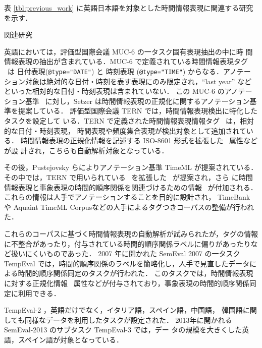 \documentclass[japanese]{jnlp_1.4}
\newcommand{\modified}[1]{}
\def\timex{}
\def\timexii{}
\def\timexiii{}
\def\value{}
\def\tlink{}
\begin{document}
表 \ref{tbl:previous_work} に英語\modified{と}日本語を対象とした時間情報表現に関連する研究を示す．

\begin{table}[b]
\caption{関連研究}
\label{tbl:previous_work}

\end{table}

英語においては，評価型国際会議 MUC-6 \cite{MUC6} の一タスク固有表現抽出の中に時
間情報表現の抽出が含まれている．MUC-6 で定義されている時間情報表現タグ \timex\ は
日付表現({\tt @type="DATE"}) と 時刻表現 ({\tt @type="TIME"}) からなる．アノテー
ション対象は絶対的な日付・時刻を表す表現にのみ限定され，``last year'' などといった相対的な日付・時刻表現は含まれていない．
この MUC-6 のアノテーション基準 \timex\ に対し，Setzer は時間情報表現の正規化に関するアノテーション基準を提案している\cite{Setzer-2001}．
評価型国際会議 TERN \cite{TERN} では，時間情報表現検出に特化したタスクを設定して
いる．TERN で定義された時間情報表現情報タグ \timexii\ は，相対的な日付・時刻表現，
時間表現や頻度集合表現が検出対象として追加されている．
時間情報表現の正規化情報を記述する ISO-8601 形式を拡張した \value\ 属性などが設
計され，こちらも自動解析対象となっている．

その後，Pustejovsky らによりアノテーション基準 TimeML \cite{TimeML}が提案されている．
その中では，TERN で用いられている \timexii\ を拡張した \timexiii\ が提案され，さら
に時間情報表現と事象表現の時間的順序関係を関連づけるための情報 \tlink\ が付加される．これらの情報は人手でアノテーションすることを目的に設計され，
TimeBank \cite{TimeBank}や Aquaint TimeML Corpusなどの人手によるタグつきコーパスの整備が行われた．

これらのコーパスに基づく時間情報表現の自動解析\cite{Boguraev-2005,Mani-2006}が試みられたが，タグの情報に不整合があったり，付与されている時間的順序関係ラベルに偏りがあったりなど扱いにくいものであった\cite{Boguraev-2006}．
2007 年に開かれた SemEval 2007 の一タスク TempEval \cite{TempEval} では，時間的順序関係のラベルを簡略化し，人手で見直したデータによる時間的順序関係同定のタスクが行われた．
このタスクでは，時間情報表現に対する正規化情報 \value\ 属性などが\modified{データにあらかじ
め}付与されており，事象表現の時間的順序関係同定に利用できる\modified{設定になっ
ている}．

\modified{時間情報表現の自動解析に関する研究は英語中心に行われていたが，やが
て言語横断的な研究が進められ，前の\ref{subsec:standard}節に示し
たような国際標準化がすすめられた．その成果物として，アノテーション形式の共有可能な基準としてISO-TimeML が策定された．その作業と並行して，評価型会議}
TempEval-2 \cite{TempEval2} \modified{が実施され}，英語だけでなく，イタリア語，スペイン語，中国語，
韓国語に関しても同様なデータを利用したタスクが設定された．
2013年に開かれる SemEval-2013 のサブタスク TempEval-3 \cite{TempEval3}では，デー
タの規模を大きくした英語，スペイン語が対象となっている．
\end{document}
